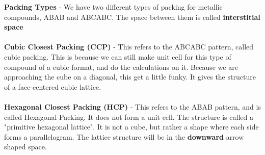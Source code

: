\documentclass{article}
\begin{document}

\pagebreak

\textbf{Packing Types} - We have two different types of packing for metallic compounds, ABAB and ABCABC. The space between them is called \textbf{interstitial space} \\
\\
\textbf{Cubic Closest Packing (CCP)} - This refers to the ABCABC pattern, called cubic packing. This is because we can still make unit cell for this type of compound of a cubic format, and do the calculations on it. Because we are approaching the cube on a diagonal, this get a little funky. It gives the structure of a face-centered cubic lattice.\\
\\
\textbf{Hexagonal Closest Packing (HCP)} - This refers to the ABAB pattern, and is called Hexagonal Packing. It does not form a unit cell. The structure is called a "primitive hexagonal lattice". It is not a cube, but rather a shape where each side forms a parallelogram. The lattice structure will be in the \textbf{downward} arrow shaped space.

% 
\end{document}
